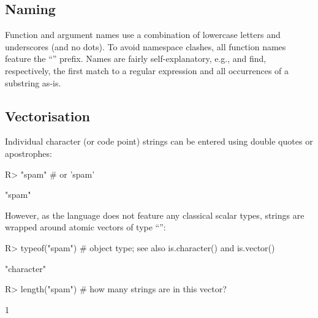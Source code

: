 \documentclass[nojss]{jss}
\begin{document}
\subsection{Naming}

Function and argument names use a combination of lowercase letters
and underscores (and no dots). To avoid namespace clashes,
all function names feature the ``'' prefix.
Names are fairly self-explanatory, e.g.,
 and 
find, respectively, the first match to a regular expression and
all occurrences of a substring as-is.





\subsection{Vectorisation}

Individual character (or code point) strings can be entered using
double quotes or apostrophes:

\begin{Schunk}
\begin{Sinput}
R> "spam"  # or 'spam'
\end{Sinput}
\begin{Soutput}
[1] "spam"
\end{Soutput}
\end{Schunk}

However, as the   language does not feature any
classical scalar types, strings are wrapped around atomic vectors
of type ``'':

\begin{Schunk}
\begin{Sinput}
R> typeof("spam")  # object type; see also is.character() and is.vector()
\end{Sinput}
\begin{Soutput}
[1] "character"
\end{Soutput}
\begin{Sinput}
R> length("spam")  # how many strings are in this vector?
\end{Sinput}
\begin{Soutput}
[1] 1
\end{Soutput}
\end{Schunk}
\end{document}
